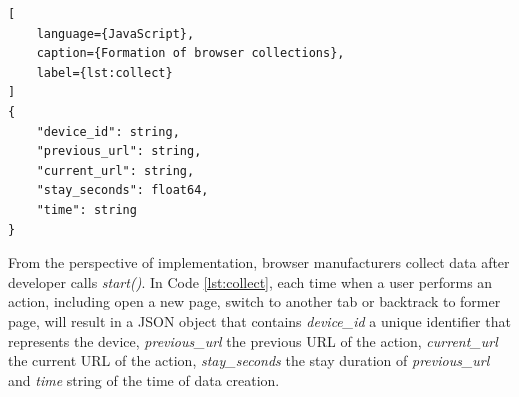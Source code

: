 \begin{lstlisting}[
    language={JavaScript},
    caption={Formation of browser collections},
    label={lst:collect}
]
{
    "device_id": string,
    "previous_url": string,
    "current_url": string,
    "stay_seconds": float64,
    "time": string
}
\end{lstlisting}

From the perspective of implementation, browser manufacturers collect data after developer
calls \emph{start()}.
In Code \ref{lst:collect}, each time when a user performs an action, including open a new page,
switch to another tab or backtrack to former page, will result in a JSON object that contains
\emph{device\_id} a unique identifier that represents the device, \emph{previous\_url} the previous
URL of the action, \emph{current\_url} the current URL of the action, \emph{stay\_seconds}
the stay duration of \emph{previous\_url} and \emph{time} string of the time of data creation.


\cleardoublepage